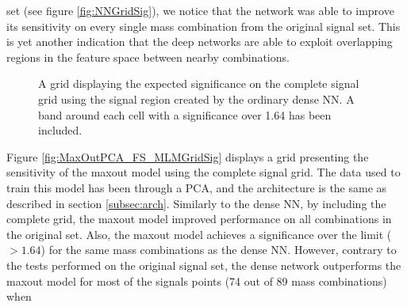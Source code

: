 set (see figure \ref{fig:NNGridSig}), we notice that the network was able to improve its sensitivity on every single mass combination from the original signal set. This is yet another 
indication that the deep networks are able to exploit overlapping regions in the feature space between nearby combinations.\\
\begin{figure}
    \caption{A grid displaying the expected significance on the complete signal grid using the signal region 
    created by the ordinary dense \acs{NN}. A band around each cell with a significance over 1.64 has been included.}
    \label{fig:NN_FS_MLMGridSig}
\end{figure}
Figure \ref{fig:MaxOutPCA_FS_MLMGridSig} displays a grid presenting the sensitivity of the maxout model using the complete signal grid.
The data used to train this model has been through a \ac{PCA}, and the architecture is the same as described in section \ref{subsec:arch}.
Similarly to the dense \ac{NN}, by including the complete grid, the maxout model improved performance on all combinations in the original set. 
Also, the maxout model achieves a significance over the limit ($>1.64$) for the same mass combinations as the dense \ac{NN}. However, contrary to the tests 
performed on the original signal set, the dense network outperforms the maxout model for most of the signals points (74 out of 89 mass combinations) when 
